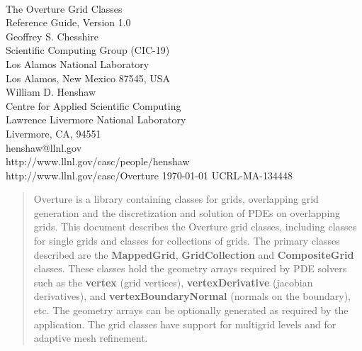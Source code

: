 \documentclass{article}
\begin{document}
\begin{titlepage}
\begin{center}
   ~~ \\
   ~~ \\
   ~~ \\
   ~~ \\
   ~~ \\
   ~~ \\
{\Large The Overture Grid Classes \\
        Reference Guide, Version 1.0} \\
\vspace{ 2\baselineskip}
Geoffrey S. Chesshire \\
\vspace{\baselineskip}
Scientific Computing Group (CIC-19) \\
Los Alamos National Laboratory \\
Los Alamos, New Mexico 87545, USA \\
\vspace{2\baselineskip}
William D. Henshaw \\
\vspace{\baselineskip}
Centre for Applied Scientific Computing \\
Lawrence Livermore National Laboratory    \\
Livermore, CA, 94551   \\
henshaw@llnl.gov \\
http://www.llnl.gov/casc/people/henshaw \\
http://www.llnl.gov/casc/Overture 
\vspace{\baselineskip}
\today
\vspace{\baselineskip}
UCRL-MA-134448
\end{center}

\vspace{ 8\baselineskip}
\begin{abstract}

Overture is a library containing classes for grids, overlapping grid
generation and the discretization and solution of PDEs on overlapping
grids.  This document describes the Overture grid classes, including
classes for single grids and classes for collections of grids.
 The primary
classes described are the {\bf MappedGrid}, {\bf GridCollection} and {\bf CompositeGrid} classes.
These classes hold the geometry arrays required by PDE solvers such as the {\bf vertex} (grid vertices),
{\bf vertexDerivative} (jacobian derivatives), and {\bf vertexBoundaryNormal} (normals
on the boundary), etc. The geometry arrays can be optionally generated as required by
the application. The grid classes have support for multigrid levels and for adaptive mesh refinement.

\end{abstract}
\end{titlepage}
\end{document}
